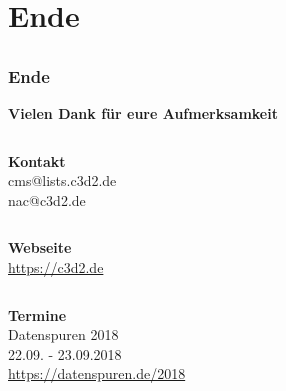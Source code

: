 \documentclass[12pt, table]{beamer}
\begin{document}
\section{Ende}
\subsection{}

\begin{frame}
	\frametitle{Ende}
	\begin{center}
		\textbf{Vielen Dank für eure Aufmerksamkeit}
	\end{center}
	\par
	\begin{columns}
		\column{3cm}
	\end{columns}
	\begin{center}
		\textbf{Kontakt}\\
		cms@lists.c3d2.de\\
		nac@c3d2.de\\
		\begin{columns}
			\column{3cm}
		\end{columns}
		\textbf{Webseite}\\
		\url{https://c3d2.de}
		\begin{columns}
			\column{3cm}
		\end{columns}
		\textbf{Termine}\\
		Datenspuren 2018\\
		22.09. - 23.09.2018\\
		\url{https://datenspuren.de/2018}
	\end{center}				
\end{frame}
\end{document}
